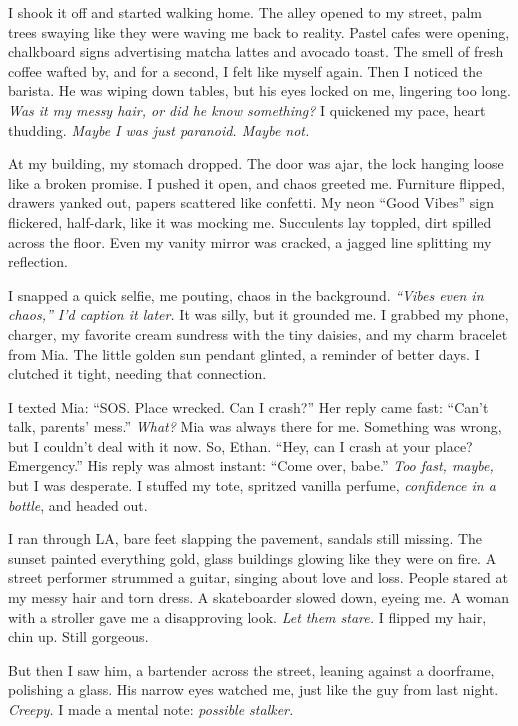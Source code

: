 \documentclass[12pt]{article}
\begin{document}
I shook it off and started walking home. The alley opened to my street, palm trees swaying like they were waving me back to reality. Pastel cafes were opening, chalkboard signs advertising matcha lattes and avocado toast. The smell of fresh coffee wafted by, and for a second, I felt like myself again. Then I noticed the barista. He was wiping down tables, but his eyes locked on me, lingering too long. \textit{Was it my messy hair, or did he know something?} I quickened my pace, heart thudding. \textit{Maybe I was just paranoid. Maybe not.}

At my building, my stomach dropped. The door was ajar, the lock hanging loose like a broken promise. I pushed it open, and chaos greeted me. Furniture flipped, drawers yanked out, papers scattered like confetti. My neon “Good Vibes” sign flickered, half-dark, like it was mocking me. Succulents lay toppled, dirt spilled across the floor. Even my vanity mirror was cracked, a jagged line splitting my reflection.

I snapped a quick selfie, me pouting, chaos in the background. \textit{“Vibes even in chaos,” I’d caption it later.} It was silly, but it grounded me. I grabbed my phone, charger, my favorite cream sundress with the tiny daisies, and my charm bracelet from \textnormal{Mia}. The little golden sun pendant glinted, a reminder of better days. I clutched it tight, needing that connection.

I texted \textnormal{Mia}: “SOS. Place wrecked. Can I crash?” Her reply came fast: “Can’t talk, parents’ mess.” \textit{What?} \textnormal{Mia} was always there for me. Something was wrong, but I couldn’t deal with it now. So, \textnormal{Ethan}. “Hey, can I crash at your place? Emergency.” His reply was almost instant: “Come over, babe.” \textit{Too fast, maybe,} but I was desperate. I stuffed my tote, spritzed vanilla perfume, \textit{confidence in a bottle}, and headed out.

I ran through LA, bare feet slapping the pavement, sandals still missing. The sunset painted everything gold, glass buildings glowing like they were on fire. A street performer strummed a guitar, singing about love and loss. People stared at my messy hair and torn dress. A skateboarder slowed down, eyeing me. A woman with a stroller gave me a disapproving look. \textit{Let them stare.} I flipped my hair, chin up. Still gorgeous.

But then I saw him, a bartender across the street, leaning against a doorframe, polishing a glass. His narrow eyes watched me, just like the guy from last night. \textit{Creepy.} I made a mental note: \textit{possible stalker.}
\end{document}
